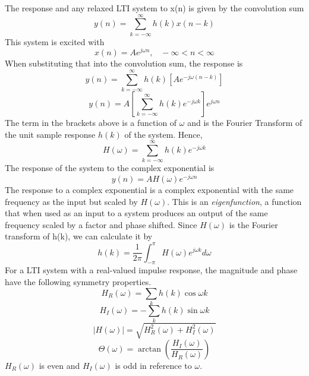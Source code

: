 \documentclass{article} %
\begin{document}
    The response and any relaxed LTI system to x(n) is given by the convolution sum
	\begin{equation}
	y(n) = \sum_{k=-\infty}^{\infty} h(k)x(n-k)
	\end{equation}
	This system is excited with 
	\begin{equation}
	x(n) = Ae^{j\omega n}, \;\;\; -\infty<n<\infty
	\end{equation}
	When substituting that into the convolution sum, the response is
	\begin{equation}
	y(n) = \sum_{k=-\infty}^{\infty} h(k)[Ae^{-j\omega (n-k)}]
	\end{equation}
	\begin{equation}
	y(n) = A[\sum_{k=-\infty}^{\infty} h(k)e^{-j\omega k}]e^{j\omega n}
	\end{equation}
	The term in the brackets above is a function of $\omega$ and is the Fourier Transform of the unit sample response $h(k)$ of the system. Hence,
	\begin{equation}
	H(\omega) = \sum_{k=-\infty}^{\infty}h(k)e^{-j\omega k}
	\end{equation}
	The response of the system to the complex exponential is 
	\begin{equation}
	y(n) = AH(\omega)e^{-j\omega n}
	\end{equation}
	The response to a complex exponential is a complex exponential with the same frequency as the input but scaled by $H(\omega)$. This is an \textit{eigenfunction}, a function that when used as an input to a system produces an output of the same frequency scaled by a factor and phase shifted. Since $H(\omega)$ is the Fourier transform of h(k), we can calculate it by
	\begin{equation}
	h(k) = \frac{1}{2\pi} \int_{-\pi}^{\pi}H(\omega)e^{j\omega k} d\omega
	\end{equation}
	For a LTI system with a real-valued impulse response, the magnitude and phase have the following symmetry properties.
	\begin{equation}
	H_R(\omega) = \sum_k h(k)\cos \omega k
	\end{equation}
	\begin{equation}
	H_I(\omega) = -\sum_k h(k)\sin \omega k
	\end{equation}
	\begin{equation}
	|H(\omega)| = \sqrt{H_R^2 (\omega) + H_I^2(\omega)}
	\end{equation}
	\begin{equation}
	\Theta (\omega) = \arctan(\frac{H_I (\omega)}{H_R (\omega)})
	\end{equation}
	$H_R(\omega)$ is even and $H_I(\omega)$ is odd in reference to $\omega$. 
	
\end{document}
